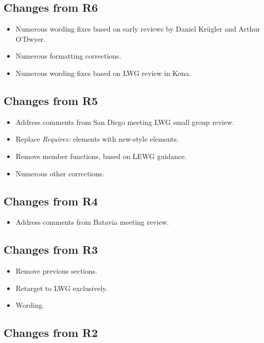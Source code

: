 \subsection{Changes from R6}

\begin{itemize}
  \item Numerous wording fixes based on early reviews by Daniel Kr{\"u}gler and Arthur O'Dwyer.
  \item Numerous formatting corrections.
  \item Numerous wording fixes based on LWG review in Kona.
\end{itemize}

\subsection{Changes from R5}

\begin{itemize}
  \item Address comments from San Diego meeting LWG small group review.
  \item Replace \textit{Requires:} elements with new-style elements.
  \item Remove  member functions, based on LEWG guidance.
  \item Numerous other corrections.
\end{itemize}

\subsection{Changes from R4}

\begin{itemize}
  \item Address comments from Batavia meeting review.
\end{itemize}

\subsection{Changes from R3}

\begin{itemize}
  \item Remove previous sections.
  \item Retarget to LWG exclusively.
  \item Wording.
\end{itemize}

\subsection{Changes from R2}

